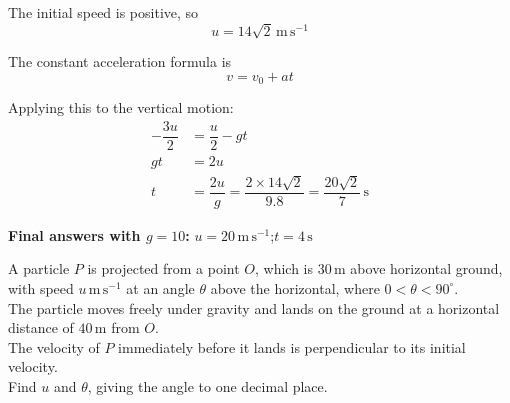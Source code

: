 \documentclass[leqno]{article}
\begin{document}
\begin{enumerate}[
  label=\textbf{\arabic*.},
  leftmargin=*,
  topsep=0pt,
  partopsep=0pt,
  parsep=0pt
]
\begin{djsSolution}
The initial speed is positive, so
\[
u=14\sqrt{2}\,\mathrm{m\,s^{-1}}
\]

The constant acceleration formula is
\[
v=v_0+at
\]

Applying this to the vertical motion:
\begin{align*}
-\dfrac{3u}{2}&=\dfrac{u}{2}-gt\\
gt&=2u\\
t&=\dfrac{2u}{g}
=\dfrac{2\times14\sqrt{2}}{9.8}
=\dfrac{20\sqrt{2}}{7}\,\mathrm{s}
\end{align*}

\par\medskip\noindent\textbf{Final answers with \(g = 10\):} \(u = 20\,\mathrm{m\,s^{-1}}\);\quad \(t = 4\,\mathrm{s}\)
\end{djsSolution}

\newpage

\questionitem

A particle $P$ is projected from a point $O$, which is $30\,\mathrm{m}$ above horizontal ground, with speed $u\,\mathrm{m\,s^{-1}}$ at an angle $\theta$ above the horizontal, where $0<\theta<90^\circ$. \\
The particle moves freely under gravity and lands on the ground at a horizontal distance of $40\,\mathrm{m}$ from $O$. \\

The velocity of $P$ immediately before it lands is perpendicular to its initial velocity. \\

Find $u$ and $\theta$, giving the angle to one decimal place.  \\

\vspace*{10pt}


\end{enumerate}
\end{document}
